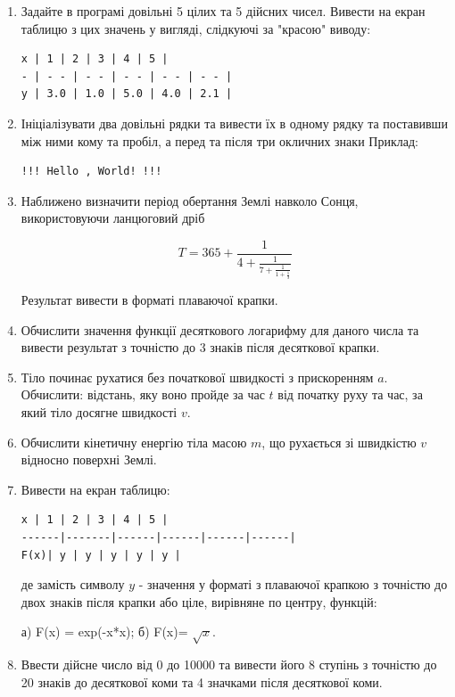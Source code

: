 \documentclass[a5paper,titlepage,openany,twoside,
]
{book_unv}%
\begin{document}
\begin{enumerate}
\def\labelenumi{\arabic{enumi}.}
\setcounter{enumi}{9}
\item
Задайте в програмі довільні 5 цілих та 5 дійсних чисел. Вивести на екран таблицю
з цих значень у вигляді, слідкуючі за "красою" виводу:
\begin{verbatim}
x | 1 | 2 | 3 | 4 | 5 |
- | - - | - - | - - | - - | - - |
y | 3.0 | 1.0 | 5.0 | 4.0 | 2.1 |
\end{verbatim}

\item
Ініціалізувати два довільні рядки та вивести їх в одному рядку та
поставивши між ними кому та пробіл, а перед та після три окличних знаки
Приклад:
\begin{verbatim}
!!! Hello , World! !!!
\end{verbatim}
\item
Наближено визначити період обертання Землі навколо Сонця,
використовуючи ланцюговий дріб

\[T = 365 + \frac{1}{4 + \frac{1}{7 + \frac{1}{1 + \frac{1}{3}}}}\]

Результат вивести в форматі плаваючої крапки.

\item
Обчислити значення функції десяткового логарифму для даного числа та
вивести результат з точністю до 3 знаків після десяткової крапки.
\item
Тіло починає рухатися без початкової швидкості з прискоренням
\(a\). Обчислити: відстань, яку воно пройде за час \(t\) від початку руху та
час, за який тіло досягне швидкості \(v\). 

\item
Обчислити кінетичну енергію тіла масою \(m\), що рухається зі
швидкістю \(v\) відносно поверхні Землі.
\item
Вивести на екран таблицю:
\begin{verbatim}
x | 1 | 2 | 3 | 4 | 5 |
------|-------|------|------|------|------|
F(x)| y | y | y | y | y |
\end{verbatim}

де замість символу $y$ - значення у форматі з плаваючої крапкою з точністю
до двох знаків після крапки або ціле, вирівняне по центру, функцій:

а) F(x) = exp(-x*x); б) F(x)= $\sqrt{x}$.

\item
Ввести дійсне число від 0 до 10000 та вивести його 8 ступінь з
точністю до 20 знаків до десяткової коми та 4 значками після
десяткової коми.


\end{enumerate}
\end{document}
